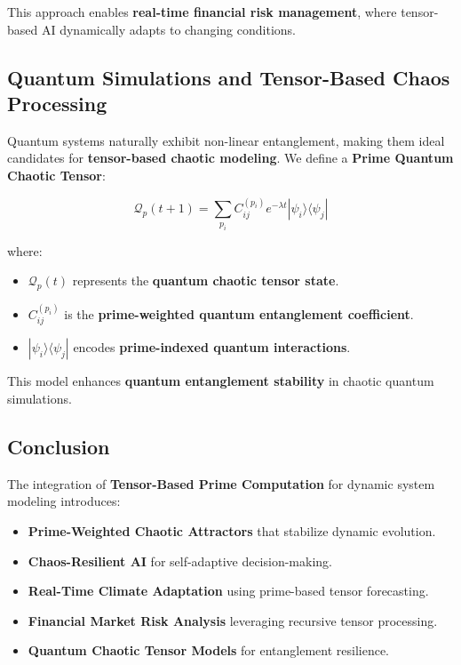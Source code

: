 \documentclass{article}
\theoremstyle{plain}
\theoremstyle{plain}
\theoremstyle{definition}
\theoremstyle{remark}
\begin{document}
This approach enables \textbf{real-time financial risk management}, where tensor-based AI dynamically adapts to changing conditions.

\subsection{Quantum Simulations and Tensor-Based Chaos Processing}

Quantum systems naturally exhibit non-linear entanglement, making them ideal candidates for \textbf{tensor-based chaotic modeling}. We define a \textbf{Prime Quantum Chaotic Tensor}:

\begin{equation}
\mathcal{Q}_p (t+1) = \sum_{p_i} C_{ij}^{(p_i)} e^{- \lambda t} |\psi_i \rangle \langle \psi_j |
\end{equation}

where:
\begin{itemize}
    \item $\mathcal{Q}_p (t)$ represents the \textbf{quantum chaotic tensor state}.
    \item $C_{ij}^{(p_i)}$ is the \textbf{prime-weighted quantum entanglement coefficient}.
    \item $|\psi_i \rangle \langle \psi_j |$ encodes \textbf{prime-indexed quantum interactions}.
\end{itemize}

This model enhances \textbf{quantum entanglement stability} in chaotic quantum simulations.

\subsection{Conclusion}

The integration of \textbf{Tensor-Based Prime Computation} for dynamic system modeling introduces:
\begin{itemize}
    \item \textbf{Prime-Weighted Chaotic Attractors} that stabilize dynamic evolution.
    \item \textbf{Chaos-Resilient AI} for self-adaptive decision-making.
    \item \textbf{Real-Time Climate Adaptation} using prime-based tensor forecasting.
    \item \textbf{Financial Market Risk Analysis} leveraging recursive tensor processing.
    \item \textbf{Quantum Chaotic Tensor Models} for entanglement resilience.
\end{itemize}
\end{document}
